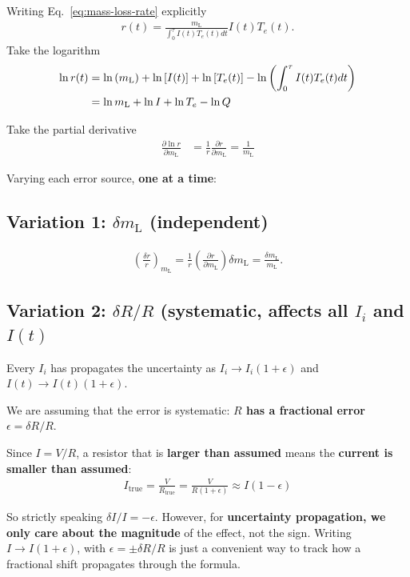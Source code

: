 \documentclass[11pt,twoside]{article}
\begin{document}
Writing Eq.~\eqref{eq:mass-loss-rate} explicitly
\begin{align*}
r(t) = \frac{m_{\mathrm{L}}}{\int_0^{\tau}I(t)T_e(t) dt} I(t) T_e(t). 
\end{align*}
Take the logarithm
\begin{align}
\ln r(t) &= \ln \left(m_{\mathrm{L}}\right) + \ln \left[ I(t) \right] + \ln \left[T_e(t)\right] - \ln \left( \int_0^{\tau}I(t)T_e(t) dt\right) \notag\\
&= \ln m_{\mathrm{L}} + \ln  I + \ln T_e - \ln Q
\end{align}

Take the partial derivative
\begin{align}
\frac{\partial \ln r}{\partial m_{\mathrm{L}}} &= \frac{1}{r} \frac{\partial r}{\partial m_{\mathrm{L}}} = \frac{1}{m_{\mathrm{L}}}
\end{align}

Varying each error source, \textbf{one at a time}:

\subsection{ Variation 1: $\delta m_{\mathrm{L}}$ (independent)}
\begin{align}
\left(\frac{\delta r}{r}\right)_{m_{\mathrm{L}}} = \frac{1}{r}\left(\frac{\partial r}{\partial m_{\mathrm{L}}}\right)\delta m_{\mathrm{L}} = \frac{\delta m_{\mathrm{L}}}{m_{\mathrm{L}}}.\tag{8}
\end{align}

\subsection{Variation 2: $\delta R/R$ (systematic, affects all $I_i$ and $I(t)$}
Every $I_i$ has propagates the uncertainty as $I_i \to I_i(1+\epsilon)$ and $I(t)\to I(t)(1+\epsilon)$. 

We are assuming that the error is systematic: \textbf{$R$ has a fractional error $\epsilon = \delta R /R$}.

Since $I = V/R$, a resistor that is \textbf{larger than assumed} means the \textbf{current is smaller than assumed}:
\begin{align*}
I_{\mathrm{true}} = \frac{V}{R_{\mathrm{true}}} = \frac{V}{R(1+\epsilon)}\approx I(1-\epsilon)
\end{align*}

So strictly speaking $\delta I / I = -\epsilon$. However, for \textbf{uncertainty propagation, we only care about the magnitude} of the effect, not the sign. Writing $I \to I (1+\epsilon)$, with $\epsilon = \pm \delta R/R$ is just a convenient way to track how a fractional shift propagates through the formula.
\end{document}

